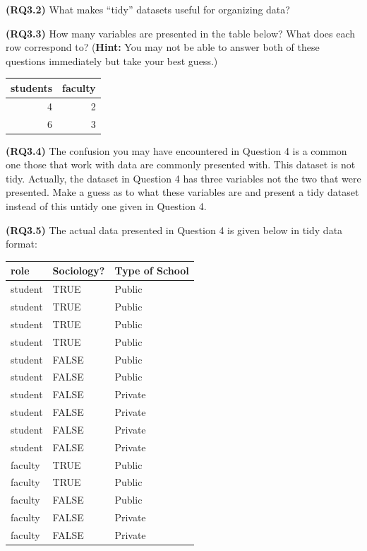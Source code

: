 \documentclass[]{tufte-book}
\begin{document}
\textbf{(RQ3.2)} What makes ``tidy'' datasets useful for organizing
data?

\textbf{(RQ3.3)} How many variables are presented in the table below?
What does each row correspond to? (\textbf{Hint:} You may not be able to
answer both of these questions immediately but take your best guess.)

\begin{tabular}{r|r}
\hline
students & faculty\\
\hline
4 & 2\\
\hline
6 & 3\\
\hline
\end{tabular}

\textbf{(RQ3.4)} The confusion you may have encountered in Question 4 is
a common one those that work with data are commonly presented with. This
dataset is not tidy. Actually, the dataset in Question 4 has three
variables not the two that were presented. Make a guess as to what these
variables are and present a tidy dataset instead of this untidy one
given in Question 4.

\textbf{(RQ3.5)} The actual data presented in Question 4 is given below
in tidy data format:

\begin{tabular}{l|l|l}
\hline
role & Sociology? & Type of School\\
\hline
student & TRUE & Public\\
\hline
student & TRUE & Public\\
\hline
student & TRUE & Public\\
\hline
student & TRUE & Public\\
\hline
student & FALSE & Public\\
\hline
student & FALSE & Public\\
\hline
student & FALSE & Private\\
\hline
student & FALSE & Private\\
\hline
student & FALSE & Private\\
\hline
student & FALSE & Private\\
\hline
faculty & TRUE & Public\\
\hline
faculty & TRUE & Public\\
\hline
faculty & FALSE & Public\\
\hline
faculty & FALSE & Private\\
\hline
faculty & FALSE & Private\\
\hline
\end{tabular}
\end{document}
